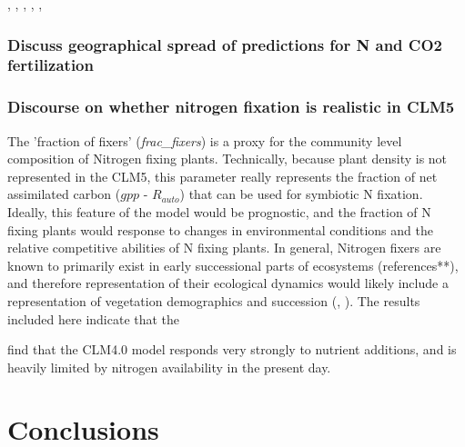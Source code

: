 \documentclass[draft,linenumbers]{agujournal}
\begin{document}
\cite{thomas2014}, \cite{friedlingstein1999}, \cite{franklin2012}, \cite{mcmurtrie2013}, \cite{anten2011}, \cite{vanwijk2003}


\subsubsection{Discuss geographical spread of predictions for N and CO2 fertilization}

\cite{hickler2008}


\subsubsection{Discourse on whether nitrogen fixation is realistic in CLM5}

The 'fraction of fixers' (\emph{frac\_fixers}) is a proxy for the community level composition of Nitrogen fixing plants. Technically, because plant density is not represented in the CLM5, this parameter really represents the fraction of net assimilated carbon ($gpp$ - $R_{auto}$) that can be used for symbiotic N fixation. Ideally, this feature of the model would be prognostic, and the fraction of N fixing plants would response to changes in environmental conditions and the relative competitive abilities of N fixing plants. In general, Nitrogen fixers are known to primarily exist in early successional parts of ecosystems (references**), and therefore representation of their ecological dynamics would likely include a representation of vegetation demographics and succession (\cite{fisher2018vegetation}, \cite{trugman2016climate}). The results included here indicate that the



\cite{thomas2013global} find that the CLM4.0 model responds very strongly to nutrient additions, and is heavily limited by nitrogen availability in the present day.



\section{Conclusions}
\end{document}
